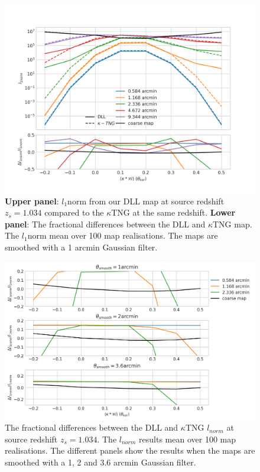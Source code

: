 \documentclass[twocolumn,twocolappendix]{aastex63}
\begin{document}
\begin{figure}
    \centering
    \includegraphics[width=\columnwidth]{paper/figures/l1normktng_comp1arc.png}
    \caption{
      \textbf{Upper panel}: $l_1$norm from our DLL map at source redshift $z_s=1.034$ compared to the $\kappa$TNG at the same redshift. \textbf{Lower panel}: The fractional differences between the DLL and $\kappa$TNG map.
 The $l_1$norm mean over 100 map realisations. The maps are smoothed with a 1 arcmin Gaussian filter. }
    \label{fig:l1normktng_comp1arc}
\end{figure}


\begin{figure}
    \centering
    \includegraphics[width=\columnwidth]{paper/figures/l1normktng_compallarc.png}
    \caption{
      The fractional differences between the DLL and $\kappa$TNG $l_{norm}$ at source redshift $z_s=1.034$.
 The $l_{norm}$ results mean over 100 map realisations. The different panels show the results when the maps are smoothed with a 1, 2 and 3.6 arcmin Gaussian filter. }
    \label{fig:l1normktng_compallarc}
\end{figure}
\end{document}
